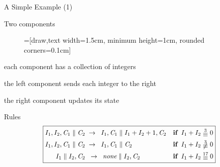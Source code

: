 \documentclass[11pt]{beamer}
\begin{document}
\begin{frame}{A Simple Example (1)}
\begin{outeritemize}
    \item Two components
    
    \begin{figure}
    =[draw,text width=1.5cm, minimum height=1cm, rounded corners=0.1cm]
    \end{figure}
    
    \begin{inneritemize}
        \item each component has a collection of integers
        \item the left component sends each integer to the right
        \item the right component updates its state 
    \end{inneritemize}
    
    \pause
    \item Rules
    \[
    \scalebox{0.95}{
    \boxed{
    \begin{aligned}
    I_1, I_2, \mathit{C}_1 \parallel \mathit{C}_2 &\;\rews \;\;I_1,\mathit{C}_1 \parallel I_1 + I_2 + 1, \mathit{C}_2  && \textbf{if} \;\;   I_1 + I_2 \;\raisebox{-0.5ex}{\ensuremath{\stackrel{3}{\equiv}}}\; 0 \\
    I_1,I_2,\mathit{C}_1 \parallel \mathit{C}_2 &\;\rews\;\;I_1,\mathit{C}_1 \parallel \mathit{C}_2 \quad && \textbf{if} \;\;  I_1 + I_2 \;\raisebox{-0.5ex}{\ensuremath{\not\stackrel{3}{\equiv}}}\; 0 \\
    I_1 \parallel I_2,\mathit{C}_2 &\;\;\rews\;\;\textit{none} \parallel I_2,\mathit{C}_2 \quad && \textbf{if}\;\; I_1 + I_2 \;\raisebox{-0.5ex}{\ensuremath{\stackrel{17}{\equiv}}}\; 0
    \end{aligned}
    }
    }
    \]
\end{outeritemize}
\end{frame}
\end{document}
